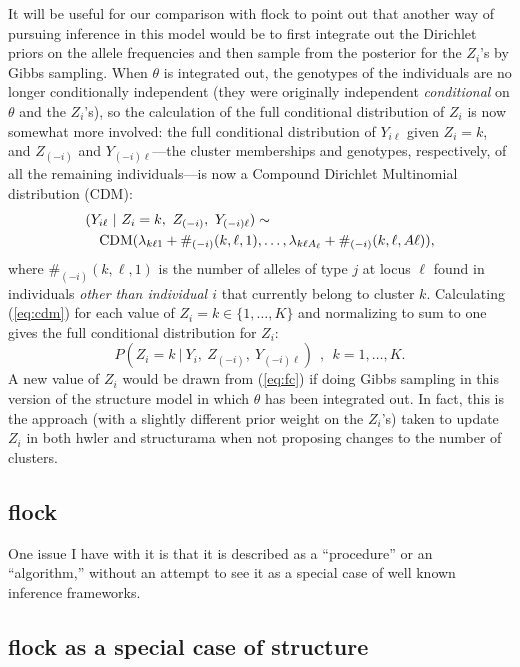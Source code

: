 It will be useful for our comparison with {\sc flock} to point out that another way 
of pursuing inference in this model would be to first integrate out the 
Dirichlet priors on the allele frequencies and then sample from the posterior
for the $Z_i$'s by Gibbs sampling.  When $\theta$ is integrated out, the genotypes 
of the individuals are no longer conditionally independent (they were originally
independent {\em conditional} on $\theta$ and the $Z_i$'s), so the calculation of 
the full conditional distribution of $Z_i$ is now somewhat more involved: the full 
conditional distribution of $Y_{i\ell}$ given $Z_i=k$, and $Z_{(-i)}$ and $Y_{(-i)\ell}$---the
cluster memberships and genotypes, respectively,  of all the remaining individuals---is
now a Compound Dirichlet Multinomial distribution (CDM):
\begin{eqnarray}
\lefteqn{(Y_{i\ell}~|~Z_i=k,~Z_{(-i)},~Y_{(-i)\ell}) \sim} \label{eq:cdm}\\
& & \mathrm{CDM}(\lambda_{k\ell 1} + \#_{(-i)}(k,\ell,1), \ldots,
\lambda_{k\ell A_\ell} + \#_{(-i)}(k,\ell,A\ell)), \nonumber
\end{eqnarray}
where $\#_{(-i)}(k,\ell,1)$ is the number of alleles of type $j$ at locus $\ell$
found in individuals {\em other than individual $i$} that currently
belong to cluster $k$. Calculating (\ref{eq:cdm}) for each value of $Z_i=k \in \{1,\ldots,K\}$ 
and normalizing to sum to one gives the full conditional distribution for 
$Z_i$:
\begin{equation}
P(Z_i=k~|~Y_i, ~Z_{(-i)},~Y_{(-i)\ell})~~,~~k=1,\ldots,K.
\label{eq:fc}
\end{equation}
A new value of $Z_i$ would be drawn from (\ref{eq:fc}) if doing Gibbs sampling in this
version of the {\sc structure} model in which $\theta$ has been integrated out.  In fact,
this is the approach (with a slightly different prior weight on the $Z_i$'s) taken to update 
$Z_i$ in both {\sc hwler} \citep{Pel&Mas2006} and {\sc structurama} \cite{Hue&And2007} when not
proposing changes to the number of clusters.



\subsection*{{\sc flock}}
One issue I have with it is that it is described as a ``procedure'' or 
an ``algorithm,'' without an attempt to see it as a special case of 
well known inference frameworks.


\subsection*{{\sc flock} as a special case of {\sc structure}}

